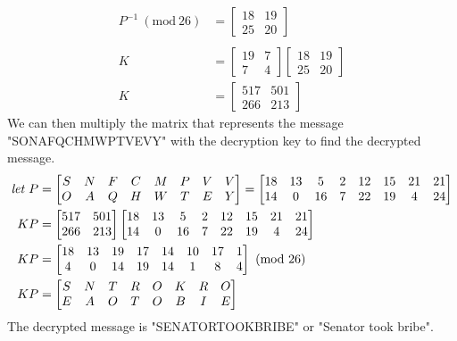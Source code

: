 \documentclass{../mathhomework}
\newcommand{\Mod}[1]{\ (\mathrm{mod}\ #1)}
\newcommand{\BlankLine}{\nonumber \\}
\begin{document}
\begin{problem}
\begin{solution}
\begin{align}
            P^{-1} \Mod{26} & = \begin{bmatrix}
                18 & 19 \\ 25 & 20
            \end{bmatrix} \\
            \BlankLine
            K &= \begin{bmatrix}
                19 & 7 \\ 7 & 4
            \end{bmatrix} \begin{bmatrix}
                18 & 19 \\ 25 & 20
            \end{bmatrix} \\
            K & = \begin{bmatrix}
                517 & 501 \\ 266 & 213
            \end{bmatrix}
        \end{align}
        We can then multiply the matrix that represents the message "SONAFQCHMWPTVEVY" with the decryption key to find the decrypted message.
        \begin{align}
            \Let P &= \begin{bmatrix}
                S & N & F & C & M & P & V & V \\
                O & A & Q & H & W & T & E & Y
            \end{bmatrix} = \begin{bmatrix}
                18 & 13 & 5 & 2 & 12 & 15 & 21 & 21 \\
                14 & 0 & 16 & 7 & 22 & 19 & 4 & 24
            \end{bmatrix} \\
            KP & = \begin{bmatrix}
                517 & 501 \\ 266 & 213
            \end{bmatrix} \begin{bmatrix}
                18 & 13 & 5 & 2 & 12 & 15 & 21 & 21 \\
                14 & 0 & 16 & 7 & 22 & 19 & 4 & 24
            \end{bmatrix} \\
            KP & = \begin{bmatrix}
                18 & 13 & 19 & 17 & 14 & 10 & 17 & 1 \\
                4 & 0 & 14 & 19 & 14 & 1 & 8 & 4
            \end{bmatrix} \Mod{26} \\
            KP & = \begin{bmatrix}
                S & N &  T & R & O & K & R & O\\
                E & A & O & T & O & B & I & E
            \end{bmatrix}
        \end{align}
        The decrypted message is "SENATORTOOKBRIBE" or "Senator took bribe".
    \end{solution}
\end{problem}
\end{document}
